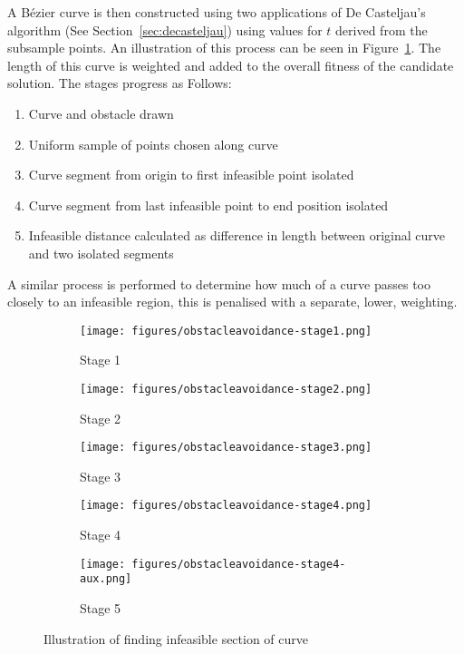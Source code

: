 A Bézier curve is then constructed using two applications of De Casteljau's algorithm (See Section~\ref{sec:decasteljau}) using values for $t$ derived from the subsample points. An illustration of this process can be seen in Figure~\ref{fig:ifspace-illustration}. The length of this curve is weighted and added to the overall fitness of the candidate solution. The stages progress as Follows:

\begin{enumerate}
  \item Curve and obstacle drawn
  \item Uniform sample of points chosen along curve
  \item Curve segment from origin to first infeasible point isolated
  \item Curve segment from last infeasible point to end position isolated
  \item Infeasible distance calculated as difference in length between original curve and two isolated segments
\end{enumerate}


A similar process is performed to determine how much of a curve passes too closely to an infeasible region, this is penalised with a separate, lower, weighting.

\begin{figure}
  \centering
  \begin{subfigure}[b]{0.44\textwidth}
    \centering
    \texttt{[image: figures/obstacleavoidance-stage1.png]}
    \caption{Stage 1}
  \end{subfigure}
  \begin{subfigure}[b]{0.44\textwidth}
    \centering
    \texttt{[image: figures/obstacleavoidance-stage2.png]}
    \caption{Stage 2}
  \end{subfigure}
  \begin{subfigure}[b]{0.44\textwidth}
    \centering
    \texttt{[image: figures/obstacleavoidance-stage3.png]}
    \caption{Stage 3}
  \end{subfigure}
  \begin{subfigure}[b]{0.44\textwidth}
    \centering
    \texttt{[image: figures/obstacleavoidance-stage4.png]}
    \caption{Stage 4}
  \end{subfigure}
  \begin{subfigure}[b]{0.44\textwidth}
    \centering
    \texttt{[image: figures/obstacleavoidance-stage4-aux.png]}
    \caption{Stage 5}
  \end{subfigure}
  \caption{\label{fig:ifspace-illustration} Illustration of finding infeasible section of curve}
\end{figure}

